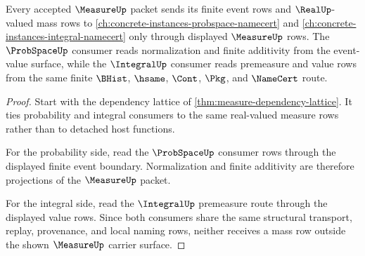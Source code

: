 \begin{theorem}
\label{thm:measure-probability-integral-dependency-route}
Every accepted $\MeasureUp$ packet sends its finite event rows and $\RealUp$-valued mass rows to \autoref{ch:concrete-instances-probspace-namecert} and \autoref{ch:concrete-instances-integral-namecert} only through displayed $\MeasureUp$ rows. The $\ProbSpaceUp$ consumer reads normalization and finite additivity from the event-value surface, while the $\IntegralUp$ consumer reads premeasure and value rows from the same finite $\BHist$, $\hsame$, $\Cont$, $\Pkg$, and $\NameCert$ route.
\end{theorem}
\begin{proof}
Start with the dependency lattice of \autoref{thm:measure-dependency-lattice}. It ties probability and integral consumers to the same real-valued measure rows rather than to detached host functions.

For the probability side, read the $\ProbSpaceUp$ consumer rows through the displayed finite event boundary. Normalization and finite additivity are therefore projections of the $\MeasureUp$ packet.

For the integral side, read the $\IntegralUp$ premeasure route through the displayed value rows. Since both consumers share the same structural transport, replay, provenance, and local naming rows, neither receives a mass row outside the shown $\MeasureUp$ carrier surface.
\end{proof}
